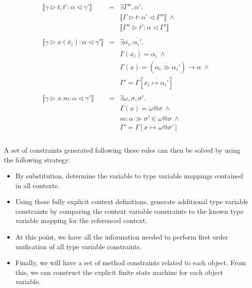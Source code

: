 \documentclass{article}
\newcommand{\inferrule}[4]{\llbracket #1 \triangleright #2 : #3 \triangleleft #4 \rrbracket}
\newcommand{\inferlhs}[1]{\llbracket \gamma \triangleright #1 : \alpha \triangleleft \gamma' \rrbracket}
\begin{document}
\[\begin{array}{lll}
\inferlhs{t ; t'}
& = &
\exists \Gamma'', \alpha' . 
\\ && 
\inferrule{\Gamma}{t}{\alpha'}{\Gamma''}\:\wedge
\\ && 
\inferrule{\Gamma''}{t'}{\alpha}{\Gamma'}
\\
\\

\inferlhs{x ( \overline{x_i} )}
& = &
\exists \overline{\alpha_i}, \overline{\alpha_i'} .
\\ && 
\overline{\Gamma(x_i) = \alpha_i}\:\wedge
\\ && 
\Gamma(x) = ( \overline{\alpha_i \gg \alpha_i'} ) \rightarrow \alpha\:\wedge
\\ && 
\Gamma' = \Gamma [ \overline{x_i \mapsto \alpha_i'} ]
\\
\\

\inferlhs{x.m}
& = &
\exists \omega, \sigma, \sigma' . 
\\ && 
\Gamma(x) = \omega @ \sigma\:\wedge
\\ && 
m : \alpha \gg \sigma' \in \omega @ \sigma\:\wedge
\\ && 
\Gamma' = \Gamma[ x \mapsto \omega @ \sigma' ]
\\
\\

\end{array}
\]

A set of constraints generated following these rules can then be solved by
using the following strategy:

\begin{itemize}
\item By substitution, determine the variable to type variable mappings
contained in all contexts.
\item Using these fully explicit context definitions, generate additional
type variable constraints by comparing the context variable constraints
to the known type variable mapping for the referenced context.
\item At this point, we have all the information needed to perform first
order unification of all type variable constraints.
\item Finally, we will have a set of method constraints related to each
object. From this, we can construct the explicit finite state machine
for each object variable.
\end{itemize}
\end{document}

